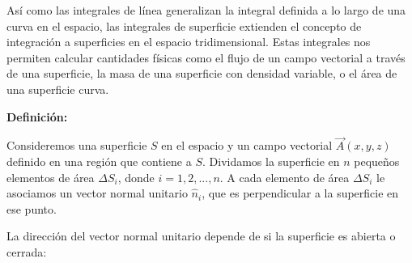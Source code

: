 \documentclass{article}
\begin{document}
Así como las integrales de línea generalizan la integral definida a lo largo de una curva en el espacio, las integrales de superficie extienden el concepto de integración a superficies en el espacio tridimensional. Estas integrales nos permiten calcular cantidades físicas como el flujo de un campo vectorial a través de una superficie, la masa de una superficie con densidad variable, o el área de una superficie curva.

\textbf{Definición:}

Consideremos una superficie $S$ en el espacio y un campo vectorial $\vec{A}(x,y,z)$ definido en una región que contiene a $S$. Dividamos la superficie en $n$ pequeños elementos de área $\Delta S_i$, donde $i = 1, 2, ..., n$. A cada elemento de área $\Delta S_i$ le asociamos un vector normal unitario $\hat{n}_i$, que es perpendicular a la superficie en ese punto.

La dirección del vector normal unitario depende de si la superficie es abierta o cerrada:
\end{document}
